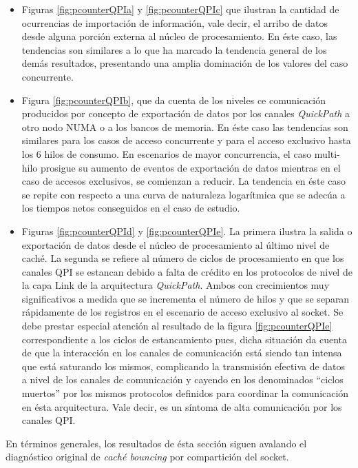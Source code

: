 \begin{itemize}
\item Figuras \ref{fig:pcounterQPIa} y \ref{fig:pcounterQPIc} que ilustran la cantidad de ocurrencias de importación de información, vale decir, el arribo de datos desde alguna porción externa al núcleo de procesamiento. En éste caso, las tendencias son similares a lo que ha marcado la tendencia general de los demás resultados, presentando una amplia dominación de los valores del caso concurrente.
\item Figura \ref{fig:pcounterQPIb}, que da cuenta de los niveles ce comunicación producidos por concepto de exportación de datos por los canales \emph{QuickPath} a otro nodo NUMA o a los bancos de memoria. En éste caso las tendencias son similares para los casos de acceso concurrente y para el acceso exclusivo hasta los 6 hilos de consumo. En escenarios de mayor concurrencia, el caso multi-hilo prosigue su aumento de eventos de exportación de datos mientras en el caso de accesos exclusivos, se comienzan a reducir. La tendencia en éste caso se repite con respecto a una curva de naturaleza logarítmica que se adecúa a los tiempos netos conseguidos en el caso de estudio.
\item Figuras \ref{fig:pcounterQPId} y \ref{fig:pcounterQPIe}. La primera ilustra la salida o exportación de datos desde el núcleo de procesamiento al último nivel de caché. La segunda se refiere al número de ciclos de procesamiento en que los canales QPI se estancan debido a falta de crédito en los protocolos de nivel de la capa Link de la arquitectura \emph{QuickPath}. Ambos con crecimientos muy significativos a medida que se incrementa el número de hilos y que se separan rápidamente de los registros en el escenario de acceso exclusivo al socket. Se debe prestar especial atención al resultado de la figura \ref{fig:pcounterQPIe} correspondiente a los ciclos de estancamiento pues, dicha situación da cuenta de que la interacción en los canales de comunicación está siendo tan intensa que está saturando los mismos, complicando la transmisión efectiva de datos a nivel de los canales de comunicación y cayendo en los denominados “ciclos muertos” por los mismos protocolos definidos para coordinar la comunicación en ésta arquitectura. Vale decir, es un síntoma de alta comunicación por los canales QPI.
\end{itemize}
En términos generales, los resultados de ésta sección siguen avalando el diagnóstico original de \emph{caché bouncing} por compartición del socket.

